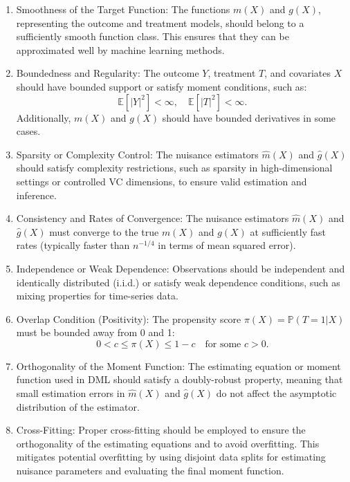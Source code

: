 \documentclass{article}
\numberwithin{equation}{section}
\begin{document}
\begin{enumerate}[label=\roman*.]
    \item Smoothness of the Target Function: The functions \( m(X) \) and \( g(X) \), representing the outcome and treatment models, should belong to a sufficiently smooth function class. This ensures that they can be approximated well by machine learning methods.
    \item Boundedness and Regularity: The outcome \( Y \), treatment \( T \), and covariates \( X \) should have bounded support or satisfy moment conditions, such as:  
    \[
    \mathbb{E}[|Y|^2] < \infty, \quad \mathbb{E}[|T|^2] < \infty.
    \]  
    Additionally, \( m(X) \) and \( g(X) \) should have bounded derivatives in some cases.
    \item Sparsity or Complexity Control: The nuisance estimators \( \hat{m}(X) \) and \( \hat{g}(X) \) should satisfy complexity restrictions, such as sparsity in high-dimensional settings or controlled VC dimensions, to ensure valid estimation and inference.
    \item Consistency and Rates of Convergence: The nuisance estimators \( \hat{m}(X) \) and \( \hat{g}(X) \) must converge to the true \( m(X) \) and \( g(X) \) at sufficiently fast rates (typically faster than \( n^{-1/4} \) in terms of mean squared error). 
    \item Independence or Weak Dependence: Observations should be independent and identically distributed (i.i.d.) or satisfy weak dependence conditions, such as mixing properties for time-series data.
    \item Overlap Condition (Positivity): The propensity score \( \pi(X) = \mathbb{P}(T=1|X) \) must be bounded away from 0 and 1:  
    \[
    0 < c \leq \pi(X) \leq 1 - c \quad \text{for some } c > 0.
    \]
    \item Orthogonality of the Moment Function: The estimating equation or moment function used in DML should satisfy a doubly-robust property, meaning that small estimation errors in \( \hat{m}(X) \) and \( \hat{g}(X) \) do not affect the asymptotic distribution of the estimator.
    \item Cross-Fitting: Proper cross-fitting should be employed to ensure the orthogonality of the estimating equations and to avoid overfitting. This mitigates potential overfitting by using disjoint data splits for estimating nuisance parameters and evaluating the final moment function.
\end{enumerate}
\end{document}
